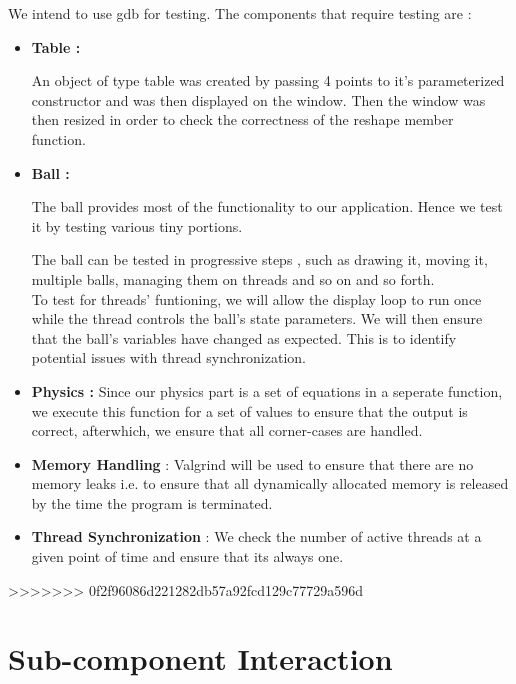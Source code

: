 \documentclass[]{article}
\begin{document}
We intend to use gdb for testing. The components that require testing are :

\begin{itemize}



\item \textbf{Table :}

An object of type table was created by passing 4 points to it's parameterized constructor and was then displayed on the window. Then the window was then resized in order to check the correctness of the reshape member function.

\item \textbf{Ball :}

The ball provides most of the functionality to our application. Hence we test it by testing various tiny portions.

The ball can be tested in progressive steps , such as drawing it, moving it, multiple balls, managing them on threads and so on and so forth. \\

To test for threads' funtioning, we will allow the display loop to run once while the thread controls the ball's state parameters. We will then ensure that the ball's variables have changed as expected. This is to identify potential issues with thread synchronization.

\item \textbf{Physics :} Since our physics part is a set of equations in a seperate function, we execute this function for a set of values to ensure that the output is correct, afterwhich, we ensure that all corner-cases are handled.



\item \textbf{Memory Handling} : Valgrind will be used to ensure that there are no memory leaks i.e. to ensure that all dynamically allocated memory is released by the time the program is terminated.

\item \textbf{Thread Synchronization} : We check the number of active threads at a given point of time and ensure that its always one.


\end{itemize}

>>>>>>> 0f2f96086d221282db57a92fcd129c77729a596d
\section{Sub-component Interaction}
\end{document}
